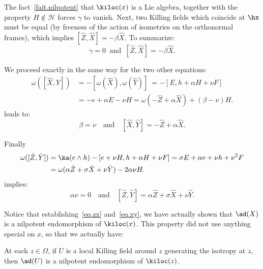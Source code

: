 The fact~\ref{fait.nilpotent} that $\kiloc(x)$ is a Lie algebra, together with the property $H \not \in {\mathcal H}$ forces $\gamma$ to vanish. Next, two Killing fields which coincide at $\hx$ must be equal (by freeness of the action of isometries on the orthonormal frames), which implies $[\hat{Z},\hat{X}]= - \beta \hat{X}$. To summarize:
\begin{equation}\label{eq.zx}
\gamma =0\ \text{ and }\ [\hat{Z},\hat{X}]= - \beta \hat{X}.
\end{equation}

We proceed exactly in the same way for the two other equations:
\begin{align*}
\omega([\hat{X},\hat{Y}])& = -[\omega(\hat{X}),\omega(\hat{Y})]\:=-[E, h + \alpha H + \nu F] \\
&= - e + \alpha E - \nu H = \omega(-\hat{Z} + \alpha \hat{X}) +(\beta - \nu) H.
\end{align*}
leads to:
\begin{equation}\label{eq.xy}
\beta=\nu \quad \text{and}\quad [\hat{X},\hat{Y}]=-\hat{Z}+ \alpha \hat{X}.
\end{equation}

Finally
\begin{align*}
\omega([\hat{Z},\hat{Y}])& = \ka(e \wedge h)-[e+ \nu H, h + \alpha H + \nu F]=\sigma E + \alpha e + \nu h + \nu^2 F \\
&= \omega(\alpha \hat{Z} + \sigma \hat{X} + \nu \hat{Y}) -2 \alpha \nu H.
\end{align*}
implies:
\begin{equation}\label{eq.zy}
\alpha \nu =0 \quad\text{and}\quad [\hat{Z},\hat{Y}]= \alpha \hat{Z} + \sigma \hat{X} + \nu \hat{Y}.
\end{equation}

Notice that establishing~\eqref{eq.zx} and~\eqref{eq.xy}, we have actually shown that $\ad(X)$ is a nilpotent endomorphism of $\kiloc(x)$. This property did not use anything special on $x$, so that we actually have:
\begin{fact}\label{fait.nilpotent}
At each $z \in \Omega$, if $U$ is a local Killing field around $z$ generating the isotropy at $z$, then $\ad(U)$ is a nilpotent endomorphism of $\kiloc(z)$.
\end{fact}



